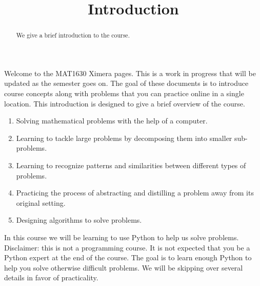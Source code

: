 \documentclass{ximera}
\title{Introduction}
\begin{document}
  
\begin{abstract}  
We give a brief introduction to the course.
\end{abstract}  
\maketitle

Welcome to the MAT1630 Ximera pages. This is a work in progress that will be updated as the semester goes on. The goal of these documents is to introduce course concepts along with problems that you can practice online in a single location. 
This introduction is designed to give a brief overview of the course.


\begin{enumerate}
	\item Solving mathematical problems with the help of a computer.
	\item Learning to tackle large problems by decomposing them into smaller sub-problems.
	\item Learning to recognize patterns and similarities between different types of problems.
	\item Practicing the process of abstracting and distilling a problem away from its original setting.
	\item Designing algorithms to solve problems.
\end{enumerate}

In this course we will be learning to use Python to help us solve problems. Disclaimer: this is not a programming course. It is not expected that you be a Python expert at the end of the course. The goal is to learn enough Python to help you solve otherwise difficult problems. We will be skipping over several details in favor of practicality. 
\end{document}
